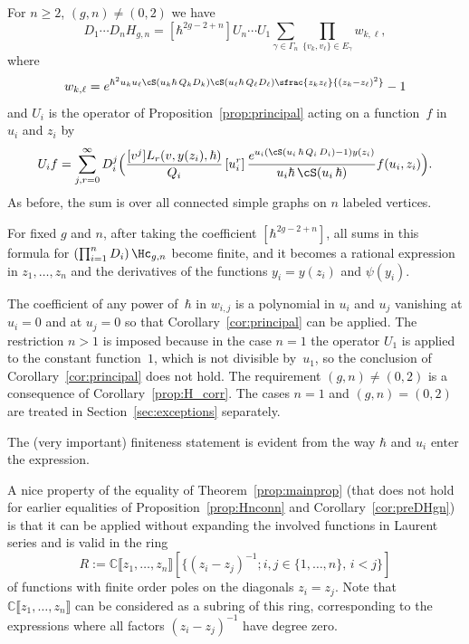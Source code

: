 \begin{theorem}\label{prop:mainprop} For $n\geq 2$, $(g,n)\neq(0,2)$ we have
\begin{equation}\label{eq:mainprop}
D_1\cdots D_nH_{g,n}=[\hbar^{2g-2+n}]
U_n\cdots U_1
\sum_{\gamma \in \Gamma_n}\prod_{\{v_k,v_\ell\}\in E_\gamma} w_{k,\ell},
\end{equation}
where
\begin{equation}\label{eq:wkl}
w_{k,\ell}=e^{\hbar^2u_ku_\ell\cS(u_k\hbar\,Q_k D_k)\cS(u_\ell\hbar\,Q_\ell D_\ell)
\sfrac{z_k z_\ell}{(z_k-z_\ell)^2}}-1
\end{equation}
and $U_{i}$ is the operator of Proposition~\ref{prop:principal} acting on a function~$f$ in~$u_i$ and $z_i$ by
\begin{equation*}\label{Uioperator}
U_{i} f=\sum_{j,r=0}^\infty D_i^j\Bigl(\frac{[v^j]L_r(v,y(z_i),\hbar)}{Q_i}
\,[u_i^r]\, \frac{e^{u_i(\cS(u_i\,\hbar\,Q_i\,D_i)-1)y(z_i)}}{u_i\hbar\,\cS(u_i\,\hbar)}f(u_i,z_i) \Bigr).
\end{equation*}
As before, the sum is over all connected simple graphs
on $n$ labeled vertices.

For fixed $g$ and $n$, after taking the coefficient $[\hbar^{2g-2+n}]$, all sums in this formula for $\left(\prod_{i=1}^n D_i\right) \Hc_{g,n}$ become finite, and it becomes a rational expression in $z_1,\ldots,z_n$ and the derivatives of the functions $y_i=y(z_i)$ and $\psi(y_i)$.
\end{theorem}

The coefficient of any power of~$\hbar$ in $w_{i,j}$ is a polynomial in $u_i$ and $u_j$ vanishing at $u_i=0$ and at $u_j=0$ so that Corollary~\ref{cor:principal} can be applied.
The restriction $n>1$ is imposed because in the case $n=1$ the operator $U_1$ is applied to the constant function~$1$, which is not divisible by~$u_1$, so the conclusion of Corollary~\ref{cor:principal} does not hold. The requirement $(g,n)\ne(0,2)$ is a consequence of Corollary~\ref{prop:H_corr}. The cases $n=1$ and $(g,n)=(0,2)$ are treated in Section~\ref{sec:exceptions} separately.

The (very important) finiteness statement is evident from the way $\hbar$ and $u_i$ enter the expression.

A nice property of the equality of Theorem~\ref{prop:mainprop} (that does not hold for earlier equalities of Proposition~\ref{prop:Hnconn} and Corollary~\ref{cor:preDHgn})
is that it can be applied without expanding the involved functions in Laurent series and is valid in the ring
\[
R:=\mathbb{C}\llbracket z_1,\dots,z_n\rrbracket [\{(z_i-z_j)^{-1};i,j\in\{1,\ldots,n\},\,i<j\}]
\]
of functions with finite order poles on the diagonals $z_i=z_j$. Note that $\mathbb{C}\llbracket z_1,\dots,z_n\rrbracket $ can be considered as a subring of this ring, corresponding to the expressions where all factors $(z_i-z_j)^{-1}$ have degree zero.

